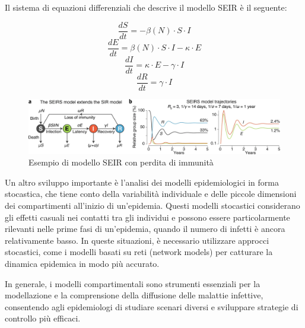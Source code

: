 Il sistema di equazioni differenziali che descrive il modello SEIR è il seguente:

\[ \frac{dS}{dt} = - \beta(N) \cdot S \cdot I \]
\[ \frac{dE}{dt} = \beta(N) \cdot S \cdot I - \kappa \cdot E \]
\[ \frac{dI}{dt} = \kappa \cdot E - \gamma \cdot I \]
\[ \frac{dR}{dt} = \gamma \cdot I \]

\begin{figure}[H]
    \begin{center}
        \includegraphics[width=\textwidth]{img/41592_2020_856_Fig1_HTML.png}
        \caption{Esempio di modello SEIR con perdita di immunità \cite{Bjornstad2020}}
        \label{fig:SEIRS_model}
    \end{center}
\end{figure}

Un altro sviluppo importante è l'analisi dei modelli epidemiologici in 
forma stocastica, che tiene conto della variabilità individuale e delle 
piccole dimensioni dei compartimenti all'inizio di un'epidemia. 
Questi modelli stocastici considerano gli effetti casuali nei contatti 
tra gli individui e possono essere particolarmente rilevanti nelle prime 
fasi di un'epidemia, quando il numero di infetti è ancora relativamente 
basso. In queste situazioni, è necessario utilizzare approcci stocastici, 
come i modelli basati su reti (network models) per catturare la dinamica 
epidemica in modo più accurato.

In generale, i modelli compartimentali sono strumenti essenziali per la 
modellazione e la comprensione della diffusione delle malattie infettive, 
consentendo agli epidemiologi di studiare scenari diversi e sviluppare 
strategie di controllo più efficaci.

